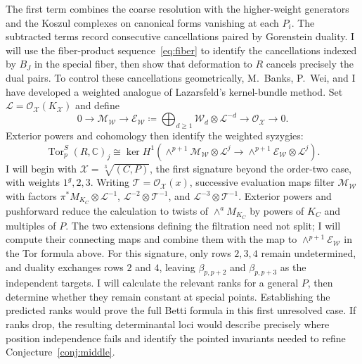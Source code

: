\documentclass[11pt,reqno]{amsart}
\theoremstyle{remark}
\newcommand{\Tor}{\operatorname{Tor}}
\newcommand{\CC}{\mathbb{C}}
\newcommand{\cE}{\mathcal{E}}
\newcommand{\cL}{\mathcal{L}}
\newcommand{\cM}{\mathcal{M}}
\newcommand{\cO}{\mathcal{O}}
\newcommand{\cT}{\mathcal{T}}
\newcommand{\cW}{\mathcal{W}}
\newcommand{\cX}{\mathcal{X}}
\begin{document}
The first term combines the coarse resolution with the higher-weight generators and the Koszul complexes on canonical forms vanishing at each $P_i$. The subtracted terms record consecutive cancellations paired by Gorenstein duality. I will use the fiber-product sequence~\eqref{eq:fiber} to identify the cancellations indexed by $B_J$ in the special fiber, then show that deformation to $R$ cancels precisely the dual pairs. To control these cancellations geometrically, M.~Banks, P.~Wei, and I have developed a weighted analogue of Lazarsfeld's kernel-bundle method. Set $\cL=\cO_{\cX}(K_{\cX})$ and define
\[
0\longrightarrow\cM_{\cW}\longrightarrow
\cE_{\cW}\coloneqq\bigoplus_{d\geq1}\cW_d\otimes\cL^{-d}
\longrightarrow\cO_{\cX}\longrightarrow0.
\]
Exterior powers and cohomology then identify the weighted syzygies:
\[
\Tor_p^S(R,\CC)_j\cong
\ker H^1\!\left(
\wedge^{p+1}\cM_{\cW}\otimes\cL^j
\longrightarrow
\wedge^{p+1}\cE_{\cW}\otimes\cL^j
\right).
\]
I will begin with $\cX=\sqrt[3]{(C,P)}$, the first signature beyond the order-two case, with weights $1^g,2,3$. Writing $\cT=\cO_{\cX}(x)$, successive evaluation maps filter $\cM_{\cW}$ with factors $\pi^*M_{K_C}\otimes\cL^{-1}$, $\cL^{-2}\otimes\cT^{-1}$, and $\cL^{-3}\otimes\cT^{-1}$. Exterior powers and pushforward reduce the calculation to twists of $\wedge^aM_{K_C}$ by powers of $K_C$ and multiples of $P$. The two extensions defining the filtration need not split; I will compute their connecting maps and combine them with the map to $\wedge^{p+1}\cE_{\cW}$ in the Tor formula above. For this signature, only rows $2,3,4$ remain undetermined, and duality exchanges rows $2$ and $4$, leaving $\beta_{p,p+2}$ and $\beta_{p,p+3}$ as the independent targets. I will calculate the relevant ranks for a general $P$, then determine whether they remain constant at special points. Establishing the predicted ranks would prove the full Betti formula in this first unresolved case. If ranks drop, the resulting determinantal loci would describe precisely where position independence fails and identify the pointed invariants needed to refine Conjecture~\ref{conj:middle}.
\end{document}
